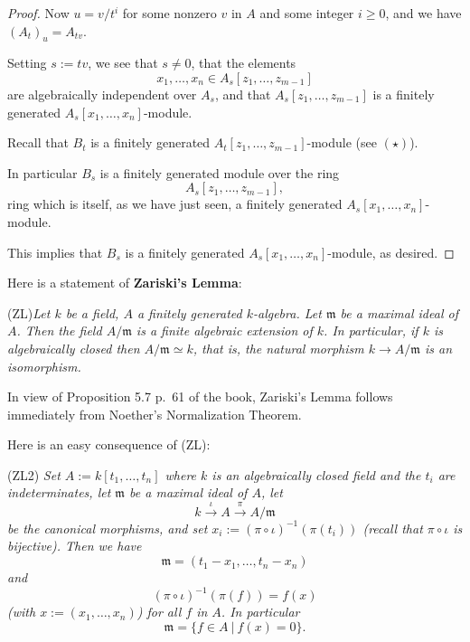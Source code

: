 \documentclass[parskip=half,fontsize=12pt]{scrartcl}%
\newcommand{\mf}{\mathfrak}
\newcommand{\mmm}{\mf m}
\begin{document}
\begin{proof}
Now $u=v/t^i$ for some nonzero $v$ in $A$ and some integer $i\ge0$, and we have $(A_t)_u=A_{tv}$. 

Setting $s:=tv$, we see that $s\ne0$, that the elements 
$$
x_1,\dots,x_n\in A_s[z_1,\dots,z_{m-1}]
$$ 
are algebraically independent over $A_s$, and that $A_s[z_1,\dots,z_{m-1}]$ is a finitely generated $A_s[x_1,\dots,x_n]$-module. 

Recall that $B_t$ is a finitely generated $A_t[z_1,\dots,z_{m-1}]$-module (see $(\star)$). 

In particular $B_s$ is a finitely generated module over the ring $$A_s[z_1,\dots,z_{m-1}],$$ ring which is itself, as we have just seen, a finitely generated $A_s[x_1,\dots,x_n]$-module. 

This implies that $B_s$ is a finitely generated $A_s[x_1,\dots,x_n]$-module, as desired.

\end{proof} 

Here is a statement of \textbf{Zariski's Lemma}:

(ZL)\emph{Let $k$ be a field, $A$ a finitely generated $k$-algebra. Let $\mmm$ be a maximal ideal of $A$. Then the field $A/\mmm$ is a finite algebraic extension of $k$. In particular, if $k$ is algebraically closed then $A/\mmm\simeq k$, that is, the natural morphism $k\to A/\mmm$ is an isomorphism.}

In view of Proposition 5.7 p.~61 of the book, Zariski's Lemma follows immediately from Noether's Normalization Theorem. %

Here is an easy consequence of (ZL):

(ZL2) \emph{Set $A:=k[t_1,\dots,t_n]$ where $k$ is an algebraically closed field and the $t_i$ are indeterminates, let $\mmm$ be a maximal ideal of $A$, let} 
$$
k\xrightarrow\iota A\xrightarrow{\pi}A/\mmm
$$ 
\emph{be the canonical morphisms, and set $x_i:=(\pi\circ\iota)^{-1}(\pi(t_i))$ (recall that $\pi\circ\iota$ is bijective). Then we have} 
$$
\mmm=(t_1-x_1,\dots,t_n-x_n)
$$ 
\emph{and} 
$$
(\pi\circ\iota)^{-1}(\pi(f))=f(x)
$$ 
\emph{(with $x:=(x_1,\dots,x_n)$) for all $f$ in $A$. In particular} 
$$
\mmm=\{f\in A\ |\ f(x)=0\}.
$$
\end{document}
